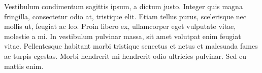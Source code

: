 \documentclass[oneside,a4paper,DIV=calc,BCOR=10mm, parskip=false]{scrreprt}
\begin{document}
Vestibulum condimentum sagittis ipsum, a dictum justo. Integer quis magna fringilla, consectetur odio at, tristique elit. Etiam tellus purus, scelerisque nec mollis ut, feugiat ac leo. Proin libero ex, ullamcorper eget vulputate vitae, molestie a mi. In vestibulum pulvinar massa, sit amet volutpat enim feugiat vitae. Pellentesque habitant morbi tristique senectus et netus et malesuada fames ac turpis egestas. Morbi hendrerit mi hendrerit odio ultricies pulvinar. Sed eu mattis enim.
\end{document}

